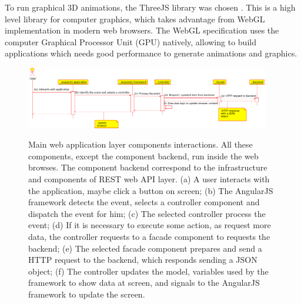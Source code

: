 \documentclass[journal]{IEEEtran}
\begin{document}
To run graphical 3D animations, the ThreeJS library was chosen \cite{Dirksen2015}.
This is a high level library for computer graphics, 
which takes advantage from WebGL implementation in modern web browsers.
The WebGL specification \cite{Matsuda2013} uses the computer Graphical Processor Unit (GPU) natively, 
allowing to build applications which needs good performance to generate animations and graphics.

\begin{figure}[tb]
	\centering
	{\includegraphics[width=0.95\textwidth]{./web_components.eps}}
	\caption{Main web application layer components interactions.
		All these components, except the component backend, run inside the web browses.
		The component backend correspond to the infrastructure and components of REST web API layer.
		(a) A user interacts with the application, maybe click a button on screen;
		(b) The AngularJS framework detects the event, selects a controller component and
		dispatch the event for him;
		(c) The selected controller process the event;
		(d) If it is necessary to execute some action, as request more data, the controller 
		requests to a facade component to requests the backend;
		(e) The selected facade component prepares and send a HTTP request to the backend,
		which responds sending a JSON object;
		(f) The controller updates the model, variables used by the framework to show data at screen,
		and signals to the AngularJS framework to update the screen.
	}
	\label{web_components}
\end{figure}
\end{document}

